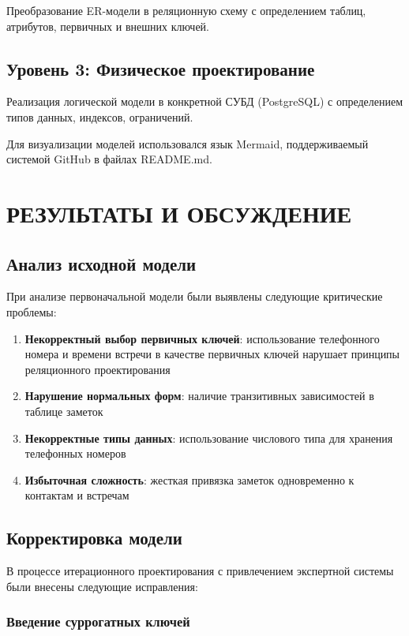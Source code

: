 \documentclass[14pt]{extarticle}
\begin{document}
Преобразование ER-модели в реляционную схему с определением таблиц, атрибутов, первичных и внешних ключей.

\subsection{Уровень 3: Физическое проектирование}

Реализация логической модели в конкретной СУБД (PostgreSQL) с определением типов данных, индексов, ограничений.

Для визуализации моделей использовался язык Mermaid, поддерживаемый системой GitHub в файлах README.md.

\section{РЕЗУЛЬТАТЫ И ОБСУЖДЕНИЕ}

\subsection{Анализ исходной модели}

При анализе первоначальной модели были выявлены следующие критические проблемы:

\begin{enumerate}
    \item \textbf{Некорректный выбор первичных ключей}: использование телефонного номера и времени встречи в качестве первичных ключей нарушает принципы реляционного проектирования
    \item \textbf{Нарушение нормальных форм}: наличие транзитивных зависимостей в таблице заметок
    \item \textbf{Некорректные типы данных}: использование числового типа для хранения телефонных номеров
    \item \textbf{Избыточная сложность}: жесткая привязка заметок одновременно к контактам и встречам
\end{enumerate}

\subsection{Корректировка модели}

В процессе итерационного проектирования с привлечением экспертной системы были внесены следующие исправления:

\subsubsection{Введение суррогатных ключей}
\end{document}
